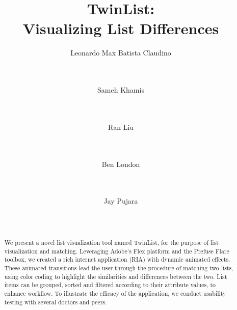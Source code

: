 \documentclass{chi2009}
\begin{document}
\setlength{\paperheight}{11in}
\setlength{\paperwidth}{8.5in}
\setlength{\pdfpageheight}{\paperheight}
\setlength{\pdfpagewidth}{\paperwidth}


\title{TwinList: \\ \large Visualizing List Differences}
\author{
  \alignauthor Leonardo Max Batista Claudino \\
    \\
    \\
  \and
  \alignauthor Sameh Khamis\\
    \\
    \\
  \and
  \alignauthor Ran Liu \\
    \\
    \\
  \and
  \alignauthor Ben London \\
    \\
    \\
  \and
  \alignauthor Jay Pujara \\
    \\
    \\
}

\maketitle

\begin{abstract}
We present a novel list visualization tool named TwinList, for the purpose of list visualization and matching. Leveraging Adobe's Flex platform and the Prefuse Flare toolbox, we created a rich internet application (RIA) with dynamic animated effects. These animated transitions lead the user through the procedure of matching two lists, using color coding to highlight the similarities and differences between the two. List items can be grouped, sorted and filtered according to their attribute values, to enhance workflow. To illustrate the efficacy of the application, we conduct usability testing with several doctors and peers.
\end{abstract}
\end{document}
